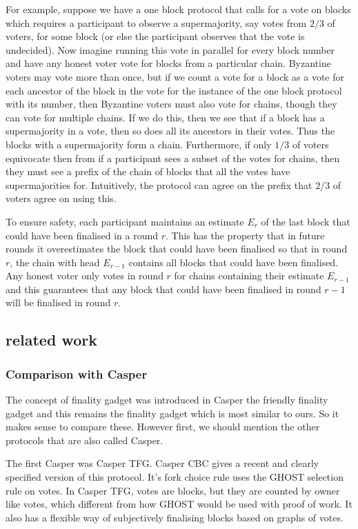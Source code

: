 \documentclass{article}
\begin{document}
For example, suppose we have a one block protocol that calls for a vote on blocks which requires a participant to observe a supermajority, say votes from  $2/3$ of voters, for some block (or else the participant observes that the vote is undecided). Now imagine running this vote in parallel for every block number and have any honest voter vote for blocks from a particular chain. Byzantine voters may vote more than once, but if we count a vote for a block as a vote for each ancestor of the block in the vote for the instance of the one block protocol with its number, then Byzantine voters must also vote for chains, though they can vote for multiple chains. If we do this, then we see that if a block has a supermajority in a vote, then so does all its ancestors in their votes. Thus the blocks with a supermajority form a chain. Furthermore, if only $1/3$ of voters equivocate then from if a participant sees a subset of the votes for chains, then they must see a prefix of the chain of blocks that all the votes have supermajorities for. Intuitively, the protocol can agree on the prefix that $2/3$ of voters agree on using this.

To ensure safety, each participant maintains an estimate $E_r$ of the last block that could have been finalised in a round $r$. This has the property that in  future rounds it overestimates the block that could have been finalised so that in round $r$, the chain with head $E_{r-1}$ contains all blocks that could have been finalised. Any honest voter only votes in round $r$ for chains containing their estimate $E_{r-1}$ and this guarantees that any block that could have been finalised in round $r-1$ will be finalised in round $r$.

\subsection{related work}

\subsubsection{Comparison with Casper}

The concept of finality gadget was introduced in Casper the friendly finality gadget and this remains the finality gadget which is most similar to ours. So it makes sense to compare these. However first, we should mention the other protocols that are also called Casper.

The first Casper was Casper TFG. Casper CBC\cite{CasperCBC} gives a recent and clearly specified version of this protocol. It's fork choice rule uses the GHOST selection rule on votes. In Casper TFG, votes are blocks, but they are counted by owner like votes, which different from how GHOST would be used with proof of work. It also has a flexible way of subjectively finalising blocks based on graphs of votes. 
\end{document}
